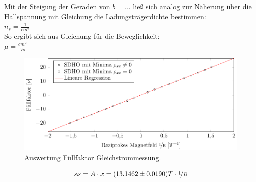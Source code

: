 Mit der Steigung der Geraden von $b=...$  %
ließ sich analog zur Näherung über die Hallspannung mit Gleichung %
die Ladungsträgerdichte bestimmen:
\\
$n_s= \frac{1}{cm^2}$  %
\\
So ergibt sich aus Gleichung %
für die Beweglichkeit:
\\
$\mu= \frac{cm^2}{Vs}$  %


\begin{figure}[h]
	\centering
	\includegraphics{graphs/dc/auswertung.pdf}
	\caption[Auswertung Füllfaktor Gleichstrommessung]{
		Auswertung Füllfaktor Gleichstrommessung.
	}
	\label{fig:dc_ausw}
\end{figure}

\begin{equation}s
\nu= A\cdot x=(13.1462 \pm 0.0190)T \cdot \nicefrac{1}{B}
\end{equation}